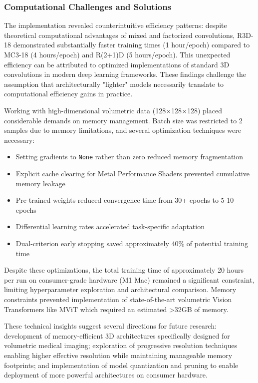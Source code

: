 \documentclass[11pt, a4paper]{article}
\begin{document}
\subsubsection{Computational Challenges and Solutions}

The implementation revealed counterintuitive efficiency patterns: despite theoretical computational advantages of mixed and factorized convolutions, R3D-18 demonstrated substantially faster training times (1 hour/epoch) compared to MC3-18 (4 hours/epoch) and R(2+1)D (5 hours/epoch). This unexpected efficiency can be attributed to optimized implementations of standard 3D convolutions in modern deep learning frameworks. These findings challenge the assumption that architecturally "lighter" models necessarily translate to computational efficiency gains in practice.

Working with high-dimensional volumetric data (128×128×128) placed considerable demands on memory management. Batch size was restricted to 2 samples due to memory limitations, and several optimization techniques were necessary:

\begin{itemize}
    \item Setting gradients to \texttt{None} rather than zero reduced memory fragmentation
    \item Explicit cache clearing for Metal Performance Shaders prevented cumulative memory leakage
    \item Pre-trained weights reduced convergence time from 30+ epochs to 5-10 epochs
    \item Differential learning rates accelerated task-specific adaptation
    \item Dual-criterion early stopping saved approximately 40\% of potential training time
\end{itemize}

Despite these optimizations, the total training time of approximately 20 hours per run on consumer-grade hardware (M1 Mac) remained a significant constraint, limiting hyperparameter exploration and architectural comparison. Memory constraints prevented implementation of state-of-the-art volumetric Vision Transformers like MViT which required an estimated >32GB of memory.

These technical insights suggest several directions for future research: development of memory-efficient 3D architectures specifically designed for volumetric medical imaging; exploration of progressive resolution techniques enabling higher effective resolution while maintaining manageable memory footprints; and implementation of model quantization and pruning to enable deployment of more powerful architectures on consumer hardware.
\end{document}
